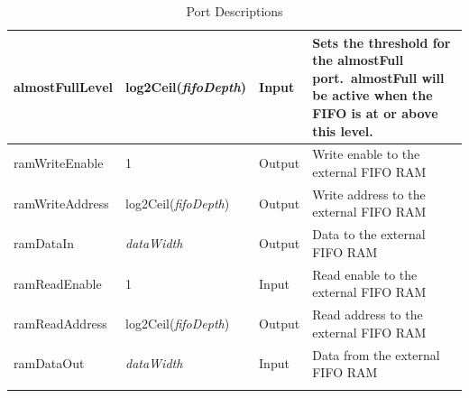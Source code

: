 \begin{longtable}[H]{
    | p{}
    | p{}
    | p{}
    | p{} |
  }
  almostFullLevel              &
  log2Ceil(\textit{fifoDepth}) &           %
  Input                        &
  Sets the threshold for the almostFull port.\ almostFull will be active
  when the FIFO is at or above this level. \\ \hline

  \rowcolor{fog-grey}
  ramWriteEnable               &
  1                            &
  Output                       &
  Write enable to the external FIFO RAM    \\ \hline

  \rowcolor{fog-grey}
  ramWriteAddress              &
  log2Ceil(\textit{fifoDepth}) &           %
  Output                       &
  Write address to the external FIFO RAM   \\ \hline

  \rowcolor{fog-grey}
  ramDataIn                    &
  \textit{dataWidth}           &
  Output                       &
  Data to the external FIFO RAM            \\ \hline

  \rowcolor{fog-grey}
  ramReadEnable                &
  1                            &
  Input                        &
  Read enable to the external FIFO RAM     \\ \hline

  \rowcolor{fog-grey}
  ramReadAddress               &
  log2Ceil(\textit{fifoDepth}) &           %
  Output                       &
  Read address to the external FIFO RAM    \\ \hline

  \rowcolor{fog-grey}
  ramDataOut                   &
  \textit{dataWidth}           &
  Input                        &
  Data from the external FIFO RAM          \\ \hline

  \caption{Port Descriptions}\label{table:ports}
\end{longtable}
